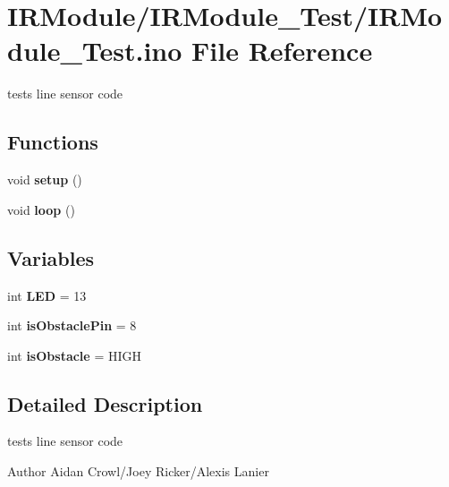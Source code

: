 \hypertarget{IRModule__Test_8ino}{}\section{I\+R\+Module/\+I\+R\+Module\+\_\+\+Test/\+I\+R\+Module\+\_\+\+Test.ino File Reference}
\label{IRModule__Test_8ino}


tests line sensor code  


\subsection*{Functions}
\begin{DoxyCompactItemize}
\item 
\mbox{\label{IRModule__Test_8ino_a4fc01d736fe50cf5b977f755b675f11d}} 
void {\bfseries setup} ()
\item 
\mbox{\label{IRModule__Test_8ino_afe461d27b9c48d5921c00d521181f12f}} 
void {\bfseries loop} ()
\end{DoxyCompactItemize}
\subsection*{Variables}
\begin{DoxyCompactItemize}
\item 
\mbox{\label{IRModule__Test_8ino_a15cedbcb33dd69bcd91a0d76d47b2ad5}} 
int {\bfseries L\+ED} = 13
\item 
\mbox{\label{IRModule__Test_8ino_ab969b3a066bdfdb5919017e83d7c6823}} 
int {\bfseries is\+Obstacle\+Pin} = 8
\item 
\mbox{\label{IRModule__Test_8ino_a2b49493baaf57180b6b332fbdaf8fd72}} 
int {\bfseries is\+Obstacle} = H\+I\+GH
\end{DoxyCompactItemize}


\subsection{Detailed Description}
tests line sensor code 

\begin{DoxyAuthor}{Author}
Aidan Crowl/\+Joey Ricker/\+Alexis Lanier 
\end{DoxyAuthor}

